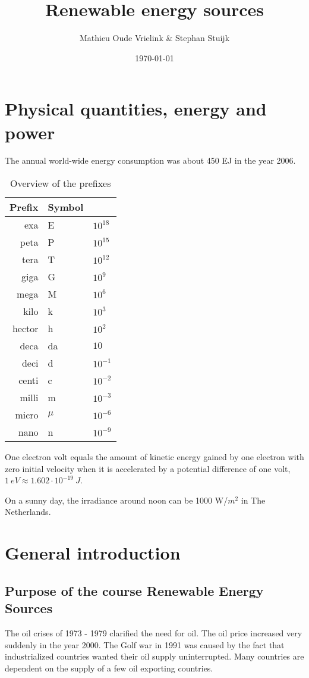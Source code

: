 \documentclass[a4paper,10pt]{article}
\title{Renewable energy sources}
\author{Mathieu Oude Vrielink \& Stephan Stuijk}
\date{\today}
\begin{document}
\maketitle

\section{Physical quantities, energy and power}


The annual world-wide energy consumption was about 450 EJ in the year 2006.

\begin{table}[ht]
\centering
 \begin{tabular}{r|ll}
  Prefix & Symbol & \\ \hline
  exa & E & $10^{18}$ \\
  peta & P & $10^{15}$ \\
  tera & T & $10^{12}$ \\
  giga & G & $10^{9}$ \\
  mega & M & $10^{6}$ \\
  kilo & k & $10^{3}$ \\
  hector & h & $10^{2}$ \\
  deca & da & $10$ \\
  deci& d & $10^{-1}$\\
  centi& c&$10^{-2}$\\
  milli& m&$10^{-3}$\\
  micro& $\mu$&$10^{-6}$\\
  nano& n&$10^{-9}$\\
 \end{tabular}
\caption{Overview of the prefixes}
\label{tab:prefixes}
\end{table}
One electron volt equals the amount of kinetic energy gained by one electron with zero initial velocity when it is accelerated by a potential difference of one volt, $1 \ eV \approx 1.602 \cdot 10^{-19}\ J$. \bigskip

On a sunny day, the irradiance around noon can be 1000 W/$m^2$ in The Netherlands.


\section{General introduction}

\subsection{Purpose of the course Renewable Energy Sources}
The oil crises of 1973 - 1979 clarified the need for oil. The oil price increased very suddenly in the year 2000. The Golf war in 1991 was caused by the fact that industrialized countries wanted their oil supply uninterrupted. Many countries are dependent on the supply of a few oil exporting countries. \bigskip
\end{document}
